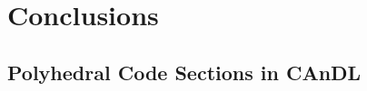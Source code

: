 \documentclass[phd,icsa,twoside,logo,11pt]{infthesis}
\begin{document}
%    

\chapter{Conclusions}
    \label{chapter:conclusion}
    




\begin{appendices}
\chapter{Polyhedral Code Sections in CAnDL}
    \label{appendix:CAnDL}
    
\end{appendices}
\end{document}
